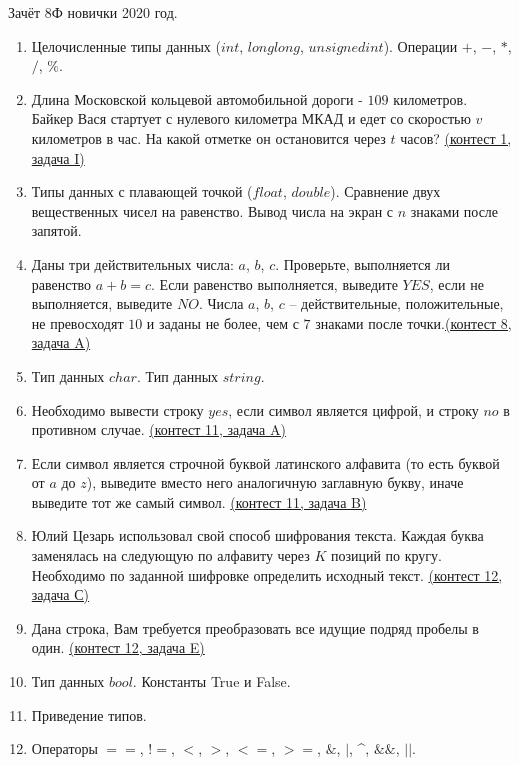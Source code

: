 \documentclass[a4paper,12pt]{article}
\begin{document}
Зачёт 8Ф новички 2020 год.
\begin{enumerate}
\item Целочисленные типы данных ($int$, $long long$, $unsigned int$). Операции $+$, $-$, $*$, $/$, $\%$.
\item Длина Московской кольцевой автомобильной дороги - $109$ километров. Байкер Вася стартует с нулевого километра МКАД и едет со скоростью $v$ километров в час. На какой отметке он остановится через $t$ часов? \href{https://informatics.msk.ru/mod/statements/view3.php?chapterid=2940}{(контест 1, задача I)}
\item Типы данных с плавающей точкой ($float$, $double$). Сравнение двух вещественных чисел на равенство. Вывод числа на экран с $n$ знаками после запятой.
\item Даны три действительных числа: $a$, $b$, $c$. Проверьте, выполняется ли равенство $a + b = c$. Если равенство выполняется, выведите $YES$, если не выполняется, выведите $NO$. Числа $a$, $b$, $c$ –  действительные, положительные, не превосходят $10$ и заданы не более, чем с $7$ знаками после точки.\href{https://informatics.msk.ru/mod/statements/view3.php?chapterid=74}{(контест 8, задача A)}
\item Тип данных $char$. Тип данных $string$.
\item Необходимо вывести  строку $yes$, если символ является цифрой, и строку $no$ в противном случае. \href{https://informatics.msk.ru/mod/statements/view3.php?chapterid=102}{(контест 11, задача A)}
\item Если символ является строчной буквой латинского алфавита (то есть буквой от $a$ до $z$), выведите вместо него аналогичную заглавную букву, иначе выведите тот же самый символ. \href{https://informatics.msk.ru/mod/statements/view3.php?chapterid=103}{(контест 11, задача B)}
\item Юлий Цезарь использовал свой способ шифрования текста. Каждая буква заменялась на следующую по алфавиту через $K$ позиций по кругу. Необходимо по заданной шифровке определить исходный текст. \href{https://informatics.msk.ru/mod/statements/view3.php?chapterid=1415}{(контест 12, задача С)}
\item Дана строка, Вам требуется преобразовать все идущие подряд пробелы в один. \href{https://informatics.msk.ru/mod/statements/view3.php?chapterid=1421}{(контест 12, задача E)}
\item Тип данных $bool$. Константы True и False.
\item Приведение типов.
\item Операторы $==$, $!=$, $<$, $>$, $<=$, $>=$, $\&$, $|$, \textasciicircum, $\&\&$, $||$.

\end{enumerate}
\end{document}
